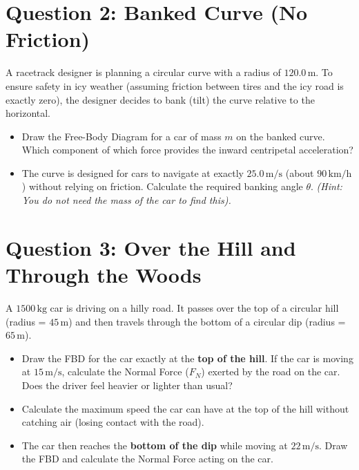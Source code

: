 \documentclass[12pt]{article}
\begin{document}
\newpage

\section*{Question 2: Banked Curve (No Friction)}

A racetrack designer is planning a circular curve with a radius of $120.0 \, \text{m}$. To ensure safety in icy weather (assuming friction between tires and the icy road is exactly zero), the designer decides to bank (tilt) the curve relative to the horizontal. 

\begin{itemize}
\item[(a)] Draw the Free-Body Diagram for a car of mass $m$ on the banked curve. Which component of which force provides the inward centripetal acceleration?
\vspace{7cm}

\item[(b)] The curve is designed for cars to navigate at exactly $25.0 \, \text{m/s}$ (about $90 \, \text{km/h}$) without relying on friction. Calculate the required banking angle $\theta$. 
\textit{(Hint: You do not need the mass of the car to find this).}
\vspace{8cm}

\end{itemize}

\newpage

\section*{Question 3: Over the Hill and Through the Woods}

A $1500 \, \text{kg}$ car is driving on a hilly road. It passes over the top of a circular hill (radius = $45 \, \text{m}$) and then travels through the bottom of a circular dip (radius = $65 \, \text{m}$). 

\begin{itemize}
\item[(a)] Draw the FBD for the car exactly at the \textbf{top of the hill}. If the car is moving at $15 \, \text{m/s}$, calculate the Normal Force ($F_N$) exerted by the road on the car. Does the driver feel heavier or lighter than usual?
\vspace{6cm}

\item[(b)] Calculate the maximum speed the car can have at the top of the hill without catching air (losing contact with the road).
\vspace{5cm}

\item[(c)] The car then reaches the \textbf{bottom of the dip} while moving at $22 \, \text{m/s}$. Draw the FBD and calculate the Normal Force acting on the car.
\vspace{6cm}

\end{itemize}
\end{document}
